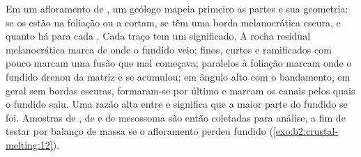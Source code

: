 \begin{inthefield}
Em um afloramento de , um geólogo mapeia primeiro as partes e sua geometria: se os
 estão na foliação ou a cortam, se têm uma borda melanocrática escura,
e quanto  há para cada . Cada traço tem um significado. A rocha residual
melanocrática marca de onde o fundido veio;  finos, curtos e ramificados com
pouco  marcam uma fusão que mal começava;  paralelos à foliação
marcam onde o fundido drenou da matriz e se acumulou;  em ângulo alto com o
bandamento, em geral sem bordas escuras, formaram-se por último e marcam os canais pelos quais o
fundido saiu. Uma razão alta entre  e  significa que a maior parte do fundido se foi.
Amostras de , de  e de mesossoma são então coletadas para análise, a fim de testar por balanço
de massa se o afloramento perdeu fundido (\cref{exo:b2:crustal-melting:12}).
\end{inthefield}

